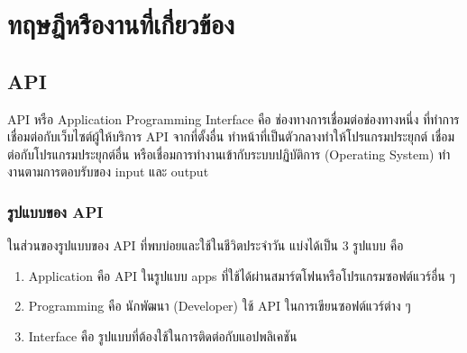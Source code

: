 \chapter{ทฤษฎีหรืองานที่เกี่ยวข้อง}
\label{chapter2}

\section{API}
    API หรือ Application Programming Interface คือ ช่องทางการเชื่อมต่อช่องทางหนึ่ง
ที่ทําการเชื่อมต่อกับเว็บไซต์ผู้ให้บริการ API จากที่ตั้งอื่น ทําหน้าที่เป็นตัวกลางทําให้โปรแกรมประยุกต์
เชื่อมต่อกับโปรแกรมประยุกต์อื่น หรือเชื่อมการทํางานเข้ากับระบบปฏิบัติการ (Operating System)
ทํางานตามการตอบรับของ input และ output
   



\subsection{รูปแบบของ API}
    ในส่วนของรูปแบบของ API ที่พบบ่อยและใช้ในชีวิตประจําวัน แบ่งได้เป็น 3 รูปแบบ คือ
    \begin{enumerate}
    \item Application คือ API ในรูปแบบ apps ที่ใช้ได้ผ่านสมาร์ตโฟนหรือโปรแกรมซอฟต์แวร์อื่น ๆ
    \item Programming คือ นักพัฒนา (Developer) ใช้ API ในการเขียนซอฟต์แวร์ต่าง ๆ
    \item Interface คือ รูปแบบที่ต้องใช้ในการติดต่อกับแอปพลิเคชัน
\end{enumerate}


